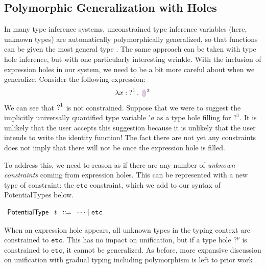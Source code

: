 \subsection{Polymorphic Generalization with Holes}
\label{sec:polymorphicGlobal}
In many type inference systems, unconstrained type inference variables (here, unknown types) are automatically polymorphically generalized, so that
functions can be given the most general type \cite{garcia:2015}. The same approach can be taken with type hole inference, but with one particularly interesting wrinkle. With the inclusion of expression holes in our system, we need to be a bit more careful about when we generalize. Consider the following expression:
$$\ECLam{x}{\TUnknown^1}{\EEHole^2}$$
We can see that $\operatorname{?}^1$ is not constrained. Suppose that we were to suggest the implicitly universally quantified type variable $'a$ as a type hole filling for $?^1$. It is unlikely that the user accepts this suggestion because it is unlikely that the user intends to write the identity function!
The fact there are not yet any constraints does not imply that there will not be once the expression hole is filled.

To address this, we need to reason as if there are any number of \emph{unknown constraints} coming from expression holes.  This can be represented with a new type of constraint: the $\mathtt{etc}$ constraint, which we add to our syntax of \textsf{PotentialType}s below. 
\begin{center}
$\arraycolsep=4pt\begin{array}{rrcl}
  \textsf{PotentialType} & t & \Coloneqq & \dots \mid \mathtt{etc}
\end{array}$
\end{center}
When an expression hole appears, all unknown types in the typing context are constrained to $\mathtt{etc}$. This has no impact on unification, but if a type hole $?^p$ is constrained to $\mathtt{etc}$, it cannot be generalized. As before, more expansive discussion on unification with gradual typing including polymorphism is left to prior work \cite{garcia:2015}.

